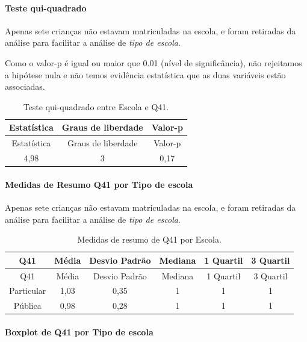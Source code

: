 \documentclass[]{article}
\let\oldparagraph\paragraph
\renewcommand{\paragraph}[1]{\oldparagraph{#1}\mbox{}}
\begin{document}
\hypertarget{teste-qui-quadrado-141}{%
\paragraph{Teste qui-quadrado}\label{teste-qui-quadrado-141}}

Apenas sete crianças não estavam matriculadas na escola, e foram retiradas da análise para facilitar a análise de \emph{tipo de escola}.

Como o valor-p é igual ou maior que 0.01 (nível de significância), não rejeitamos a hipótese nula e não temos evidência estatística que as duas variáveis estão associadas.

\begin{longtable}[]{@{}ccc@{}}
\caption{\label{tab:unnamed-chunk-1648}Teste qui-quadrado entre Escola e Q41.}\tabularnewline
\toprule
Estatística & Graus de liberdade & Valor-p\tabularnewline
\midrule
\endfirsthead
\toprule
Estatística & Graus de liberdade & Valor-p\tabularnewline
\midrule
\endhead
4,98 & 3 & 0,17\tabularnewline
\bottomrule
\end{longtable}

\cleardoublepage

\hypertarget{medidas-de-resumo-q41-por-tipo-de-escola}{%
\paragraph{Medidas de Resumo Q41 por Tipo de escola}\label{medidas-de-resumo-q41-por-tipo-de-escola}}

Apenas sete crianças não estavam matriculadas na escola, e foram retiradas da análise para facilitar a análise de \emph{tipo de escola}.

\begin{longtable}[]{@{}cccccc@{}}
\caption{\label{tab:unnamed-chunk-1649}Medidas de resumo de Q41 por Escola.}\tabularnewline
\toprule
Q41 & Média & Desvio Padrão & Mediana & 1 Quartil & 3 Quartil\tabularnewline
\midrule
\endfirsthead
\toprule
Q41 & Média & Desvio Padrão & Mediana & 1 Quartil & 3 Quartil\tabularnewline
\midrule
\endhead
Particular & 1,03 & 0,35 & 1 & 1 & 1\tabularnewline
Pública & 0,98 & 0,28 & 1 & 1 & 1\tabularnewline
\bottomrule
\end{longtable}

\hypertarget{boxplot-de-q41-por-tipo-de-escola}{%
\paragraph{Boxplot de Q41 por Tipo de escola}\label{boxplot-de-q41-por-tipo-de-escola}}
\end{document}

